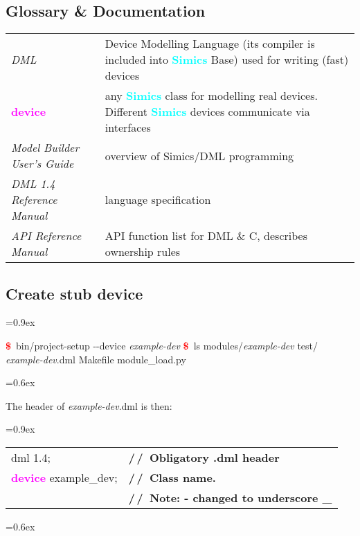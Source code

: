 \documentclass[8pt]{extarticle}
\newenvironment{code}[1][]{%
\begin{prebox}[#1]\obeylines%
\fontdimen2\font=0.9ex%
}{%
\end{prebox}%
\fontdimen2\font=0.6ex%
}
\newcommand{\prompt}{\textcolor{red}{\textbf{\$}\ }}
\newcommand{\kw}[1]{\textcolor{magenta}{\textbf{#1}}}
\newcommand{\cmtcommon}[1]{\textcolor{Sepia}{\textbf{#1}}}
\newcommand{\cmtd}[1]{\cmtcommon{/\,/\ #1}}
\newcommand{\p}[1]{\textit{\large#1}}
\newcommand{\Simics}{\textcolor{cyan}{\textbf{Simics}}}
\newlength{\MyLen}
\begin{document}
\begin{multicols*}{3}
\subsection{Glossary \& Documentation}
    \begin{tabular}{p{\the\MyLen}p{\linewidth-\the\MyLen-0.8cm}}
        \textit{DML}         & Device Modelling Language (its compiler 
        is included into \Simics{} Base) used for writing (fast) devices
        \\
        \kw{device}          & any \Simics{} class for modelling real
        devices. Different \Simics{} devices communicate via interfaces
        \\
        \textit{Model Builder User’s Guide} & overview of Simics/DML
        programming \\
        \textit{DML 1.4 Reference Manual} & language specification \\
        \textit{API Reference Manual} & API function list for DML \& C,
        describes ownership rules
    \end{tabular}

\subsection{Create stub device}

\begin{code}
    \prompt bin/project-setup -{}-device \p{example-dev}
    \prompt ls modules/\p{example-dev}
    test/  \p{example-dev}.dml  Makefile  module\_load.py
\end{code}

The header of \p{example-dev}.dml is then:

\begin{code}
    \begin{tabular}{ll}
        dml 1.4;                  & \cmtd{Obligatory .dml header} \\
        \kw{device} example\_dev; & \cmtd{Class name.} \\
                                  & \cmtd{Note: - changed to underscore \_}
    \end{tabular}
\end{code}


\end{multicols*}
\end{document}
